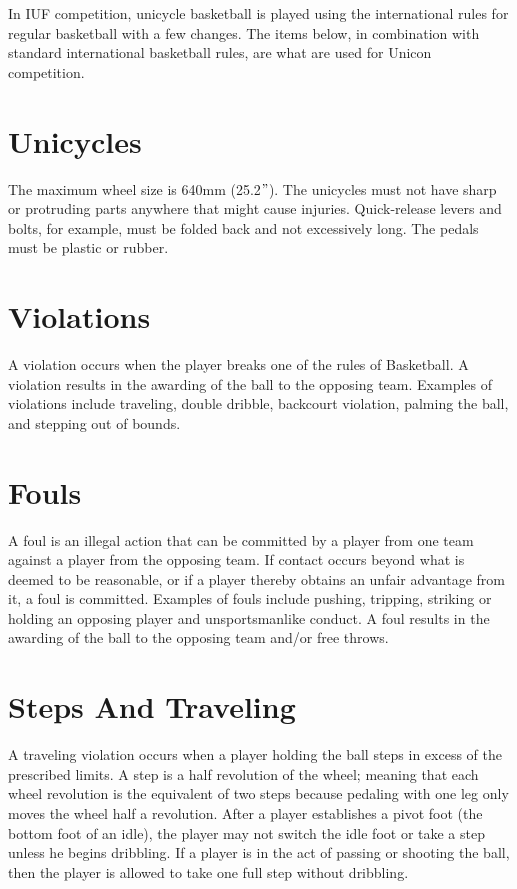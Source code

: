 In IUF competition, unicycle basketball is played using the international rules for regular basketball with a few changes.
The items below, in combination with standard international basketball rules, are what are used for Unicon competition.

\section{Unicycles}
The maximum wheel size is 640mm (25.2$"$).
The unicycles must not have sharp or protruding parts anywhere that might
cause injuries.
Quick-release levers and bolts, for example, must be folded back and not excessively long.
The pedals must be plastic or rubber.

\section{Violations}
A violation occurs when the player breaks one of the rules of Basketball.
A violation results in the awarding of the ball to the opposing team.
Examples of violations include traveling, double dribble, backcourt violation, palming the ball, and stepping out of bounds.

\section{Fouls}
A foul is an illegal action that can be committed by a player from one team against a player from the opposing team.
If contact occurs beyond what is deemed to be reasonable, or if a player thereby obtains an unfair advantage from it, a foul is committed.
Examples of fouls include pushing, tripping, striking or holding an opposing player and unsportsmanlike conduct.
A foul results in the awarding of the ball to the opposing team and/or free throws.

\section{Steps And Traveling}
A traveling violation occurs when a player holding the ball steps in excess of the prescribed limits.
A step is a half revolution of the wheel; meaning that each wheel revolution is the equivalent of two steps because pedaling with one leg only moves the wheel half a revolution.
After a player establishes a pivot foot (the bottom foot of an idle), the player may not switch the idle foot or take a step unless he begins dribbling.
If a player is in the act of passing or shooting the ball, then the player is allowed to take one full step without dribbling.

